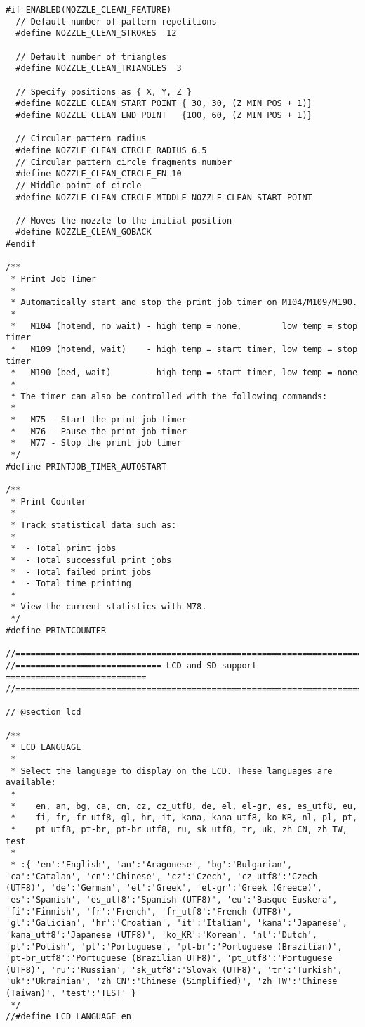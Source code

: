 \begin{lstlisting}
#if ENABLED(NOZZLE_CLEAN_FEATURE)
  // Default number of pattern repetitions
  #define NOZZLE_CLEAN_STROKES  12

  // Default number of triangles
  #define NOZZLE_CLEAN_TRIANGLES  3

  // Specify positions as { X, Y, Z }
  #define NOZZLE_CLEAN_START_POINT { 30, 30, (Z_MIN_POS + 1)}
  #define NOZZLE_CLEAN_END_POINT   {100, 60, (Z_MIN_POS + 1)}

  // Circular pattern radius
  #define NOZZLE_CLEAN_CIRCLE_RADIUS 6.5
  // Circular pattern circle fragments number
  #define NOZZLE_CLEAN_CIRCLE_FN 10
  // Middle point of circle
  #define NOZZLE_CLEAN_CIRCLE_MIDDLE NOZZLE_CLEAN_START_POINT

  // Moves the nozzle to the initial position
  #define NOZZLE_CLEAN_GOBACK
#endif

/**
 * Print Job Timer
 *
 * Automatically start and stop the print job timer on M104/M109/M190.
 *
 *   M104 (hotend, no wait) - high temp = none,        low temp = stop timer
 *   M109 (hotend, wait)    - high temp = start timer, low temp = stop timer
 *   M190 (bed, wait)       - high temp = start timer, low temp = none
 *
 * The timer can also be controlled with the following commands:
 *
 *   M75 - Start the print job timer
 *   M76 - Pause the print job timer
 *   M77 - Stop the print job timer
 */
#define PRINTJOB_TIMER_AUTOSTART

/**
 * Print Counter
 *
 * Track statistical data such as:
 *
 *  - Total print jobs
 *  - Total successful print jobs
 *  - Total failed print jobs
 *  - Total time printing
 *
 * View the current statistics with M78.
 */
#define PRINTCOUNTER

//=============================================================================
//============================= LCD and SD support ============================
//=============================================================================

// @section lcd

/**
 * LCD LANGUAGE
 *
 * Select the language to display on the LCD. These languages are available:
 *
 *    en, an, bg, ca, cn, cz, cz_utf8, de, el, el-gr, es, es_utf8, eu,
 *    fi, fr, fr_utf8, gl, hr, it, kana, kana_utf8, ko_KR, nl, pl, pt,
 *    pt_utf8, pt-br, pt-br_utf8, ru, sk_utf8, tr, uk, zh_CN, zh_TW, test
 *
 * :{ 'en':'English', 'an':'Aragonese', 'bg':'Bulgarian', 'ca':'Catalan', 'cn':'Chinese', 'cz':'Czech', 'cz_utf8':'Czech (UTF8)', 'de':'German', 'el':'Greek', 'el-gr':'Greek (Greece)', 'es':'Spanish', 'es_utf8':'Spanish (UTF8)', 'eu':'Basque-Euskera', 'fi':'Finnish', 'fr':'French', 'fr_utf8':'French (UTF8)', 'gl':'Galician', 'hr':'Croatian', 'it':'Italian', 'kana':'Japanese', 'kana_utf8':'Japanese (UTF8)', 'ko_KR':'Korean', 'nl':'Dutch', 'pl':'Polish', 'pt':'Portuguese', 'pt-br':'Portuguese (Brazilian)', 'pt-br_utf8':'Portuguese (Brazilian UTF8)', 'pt_utf8':'Portuguese (UTF8)', 'ru':'Russian', 'sk_utf8':'Slovak (UTF8)', 'tr':'Turkish', 'uk':'Ukrainian', 'zh_CN':'Chinese (Simplified)', 'zh_TW':'Chinese (Taiwan)', 'test':'TEST' }
 */
//#define LCD_LANGUAGE en


\end{lstlisting}
